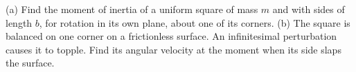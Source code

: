 (a) Find the moment of inertia of a uniform square of mass $m$ and with sides of length $b$,
for rotation in its own plane, about one of its corners.\answercheck\hwendpart
(b) The square is balanced on one corner on a frictionless surface. An infinitesimal perturbation
causes it to topple. Find its angular velocity at the moment when its side slaps the surface.\answercheck
